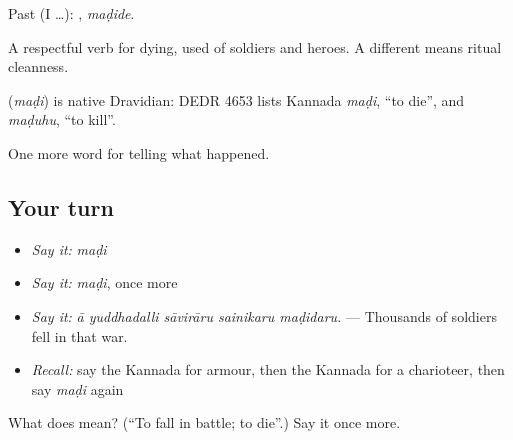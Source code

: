 Past (I …): , \emph{maḍide}.

A respectful verb for dying, used of soldiers and heroes. A different  means ritual cleanness.

\begin{cousinweb}
\textbf{} (\emph{maḍi}) is native Dravidian: DEDR 4653 lists Kannada \emph{maḍi}, \textquotedblleft{}to die\textquotedblright{}, and \emph{maḍuhu}, \textquotedblleft{}to kill\textquotedblright{}.
\end{cousinweb}

\begin{grammarlens}[title={What you've built}]
One more word for telling what happened.
\end{grammarlens}

\subsection*{Your turn}
\begin{itemize}
\raggedright
  \item \emph{Say it:} \emph{maḍi}
  \item \emph{Say it:} \emph{maḍi}, once more
  \item \emph{Say it:} \emph{ā yuddhadalli sāvirāru sainikaru maḍidaru.} — Thousands of soldiers fell in that war.
  \item \emph{Recall:} say the Kannada for armour, then the Kannada for a charioteer, then say \emph{maḍi} again
\end{itemize}

\begin{tcolorbox}[breakable,colback=teal!4,colframe=teal!35!black,title={Before you move on}]
What does  mean? (\textquotedblleft{}To fall in battle; to die\textquotedblright{}.) Say it once more.
\end{tcolorbox}
